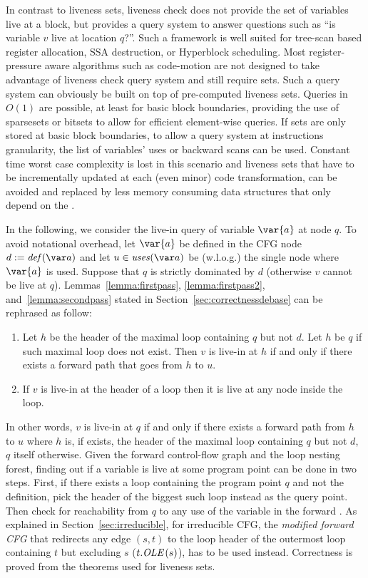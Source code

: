 In contrast to liveness sets, liveness check does not provide the set of variables live at a block, but provides a query system to answer questions such as ``is variable $v$ live at location $q$?''.
Such a framework is well suited for tree-scan based register allocation, SSA destruction, or Hyperblock scheduling.
Most register-pressure aware algorithms such as code-motion are not designed to take advantage of liveness check query system and still require sets.
Such a query system can obviously be built on top of pre-computed liveness sets.
Queries in $O(1)$ are possible, at least for basic block boundaries, providing the use of sparsesets or bitsets to allow for efficient element-wise queries.
If sets are only stored at basic block boundaries, to allow a query system at instructions granularity, the list of variables' uses or backward scans can be used.
Constant time worst case complexity is lost in this scenario and liveness sets that have to be incrementally updated at each (even minor) code transformation, can be avoided and replaced by less memory consuming data structures that only depend on the \@CFG.

In the following, we consider the live-in query of variable $\var{a}$ at node $q$.
To avoid notational overhead, let $\var{a}$ be defined in the CFG node $d:=\ldef{a}$ and let $u \in \luse{a}$ be (w.l.o.g.) the single node where $\var{a}$ is used.
Suppose that $q$ is strictly dominated by $d$ (otherwise $v$ cannot be live at $q$).
Lemmas~\ref{lemma:firstpass}, \ref{lemma:firstpass2}, and~\ref{lemma:secondpass} stated in Section~\ref{sec:correctnessdebase} can be rephrased as follow:
\begin{enumerate}
\item
	Let $h$ be the header of the maximal loop containing $q$ but not $d$.
	Let $h$ be $q$ if such maximal loop does not exist.
	Then $v$ is live-in at $h$ if and only if there exists a forward path that goes from $h$ to $u$.
\item
	If $v$ is live-in at the header of a loop then it is live at any node inside the loop.
\end{enumerate}

In other words, $v$ is live-in at $q$ if and only if there exists a forward path from $h$ to $u$ where $h$ is, if exists, the header of the maximal loop containing $q$ but not $d$, $q$ itself otherwise.
Given the forward control-flow graph and the loop nesting forest, finding out if a variable is live at some program point can be done in two steps.
First, if there exists a loop containing the program point $q$ and not the definition, pick the header of the biggest such loop instead as the query point.
Then check for reachability from $q$ to any use of the variable in the forward \@CFG.
As explained in Section~\ref{sec:irreducible}, for irreducible CFG, the \emph{modified forward CFG} that redirects any edge $(s,t)$ to the loop header of the outermost loop containing $t$ but excluding $s$ ($t.\textit{OLE}\,(s)$), has to be used instead.
Correctness is proved from the theorems used for liveness sets.

